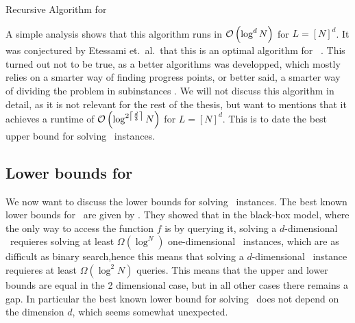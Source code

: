 \begin{algorithm}
    \caption{Recursive Algorithm for \Tarski}
    \label{alg:recursive_tarski_solver}
\end{algorithm}

A simple analysis shows that this algorithm runs in $\mathcal{O}\left(\log^{d}{N}\right)$ for $L = [N]^d$. It was conjectured by Etessami et.\ al.\ that this is an optimal algorithm for \Tarski\ . This turned out not to be true, as a better algorithms was developped, which mostly relies on a smarter way of finding progress points, or better said, a smarter way of dividing the problem in subinstances . We will not discuss this algorithm in detail, as it is not relevant for the rest of the thesis, but want to mentions that it achieves a runtime of $\mathcal{O}\left(\log^{2\left\lceil\frac{d}{3}\right\rceil}{N}\right)$ for $L = [N]^d$. This is to date the best upper bound for solving \Tarski\ instances.

\subsection{Lower bounds for \Tarski}

We now want to discuss the lower bounds for solving \Tarski\ instances. The best known lower bounds for \Tarski\ are given by . They showed that in the black-box model, where the only way to access the function $f$ is by querying it, solving a $d$-dimensional \Tarski\ requieres solving at least $\Omega(\log^{N})$ one-dimensional \Tarski\ instances, which are as difficult as binary search,hence this means that solving a $d$-dimensional \Tarski\ instance requieres at least $\Omega(\log^{2}{N})$ queries. This means that the upper and lower bounds are equal in the 2 dimensional case, but in all other cases there remains a gap. In particular the best known lower bound for solving \Tarski\ does not depend on the dimension $d$, which seems somewhat unexpected.

